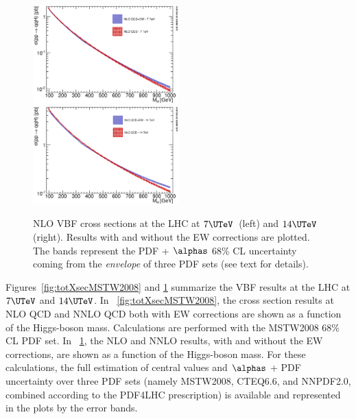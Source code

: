 \begin{figure}
  \includegraphics[width=0.5\textwidth]{YRHXS_VBF/YRHXS_VBF_fig3.eps}
  \includegraphics[width=0.5\textwidth]{YRHXS_VBF/YRHXS_VBF_fig4.eps}
  \caption{NLO VBF cross sections at the LHC at $7\UTeV$~(left) and
    $14\UTeV$ (right). Results with and without the EW corrections
    are plotted. The bands represent the PDF + $\alphas$ 68\% CL uncertainty coming from
	 the {\em envelope} of three PDF sets (see text for details).}
  \label{fig:totXsecEnvelope}
\end{figure}

Figures~\ref{fig:totXsecMSTW2008} and \ref{fig:totXsecEnvelope}
summarize the VBF results at the LHC at $7\UTeV$ and $14\UTeV$.  In
\Figure~\ref{fig:totXsecMSTW2008}, the cross section results at NLO
QCD and NNLO QCD both with EW corrections are shown
as a function of the Higgs-boson mass.
Calculations are performed with the
MSTW2008 68\% CL PDF set.  In \Figure~\ref{fig:totXsecEnvelope}, the NLO and
NNLO results, with and without the EW corrections, are shown as a function of
the Higgs-boson mass. For these calculations, the full estimation of central
values and $\alphas$ + PDF uncertainty over three PDF sets (namely MSTW2008,
CTEQ6.6, and NNPDF2.0, combined according to the PDF4LHC prescription) is
available and represented in the plots by the error bands.

